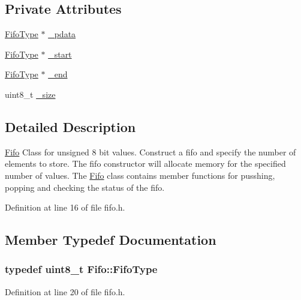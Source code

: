 \subsection*{Private Attributes}
\begin{DoxyCompactItemize}
\item 
\hyperlink{class_fifo_abc2a9e471beb538424db9e33955ec5f7}{FifoType} $\ast$ \hyperlink{class_fifo_adb3c9f91291d0af42197c7b30a718506}{\_\-pdata}
\item 
\hyperlink{class_fifo_abc2a9e471beb538424db9e33955ec5f7}{FifoType} $\ast$ \hyperlink{class_fifo_a440e9cfd5fd73a4f571a4027ff74d8d2}{\_\-start}
\item 
\hyperlink{class_fifo_abc2a9e471beb538424db9e33955ec5f7}{FifoType} $\ast$ \hyperlink{class_fifo_a5dea8e3ee360dd0555d25f1a57938a8f}{\_\-end}
\item 
uint8\_\-t \hyperlink{class_fifo_a0eb7824d54929e385223ef2e32c45c91}{\_\-size}
\end{DoxyCompactItemize}


\subsection{Detailed Description}
\hyperlink{class_fifo}{Fifo} Class for unsigned 8 bit values. Construct a fifo and specify the number of elements to store. The fifo constructor will allocate memory for the specified number of values. The \hyperlink{class_fifo}{Fifo} class contains member functions for pusshing, popping and checking the status of the fifo. 

Definition at line 16 of file fifo.h.



\subsection{Member Typedef Documentation}
\hypertarget{class_fifo_abc2a9e471beb538424db9e33955ec5f7}{
\subsubsection[{FifoType}]{\setlength{\rightskip}{0pt plus 5cm}typedef uint8\_\-t {\bf Fifo::FifoType}}}
\label{class_fifo_abc2a9e471beb538424db9e33955ec5f7}


Definition at line 20 of file fifo.h.



